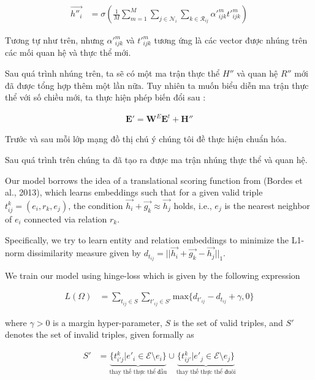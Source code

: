 \begin{align}
{\overrightarrow{h''_{i}}}&={\sigma\left(\frac{1}{M} \sum_{m=1}^{M} \sum_{j \in \mathcal{N}_i} \sum_{k \in \mathcal{R}_{ij}} \alpha'^m_{ijk} t'^m_{ijk}\right)}
\end{align}

Tương tự như trên, nhưng $\alpha'^m_{ijk}$ và $t'^m_{ijk}$ tương ứng là các vector được nhúng trên các mối quan hệ và thực thể mới.

Sau quá trình nhúng trên, ta sẽ có một ma trận thực thể $H''$ và quan hệ $R''$ mới đã được tổng hợp thêm một lần nữa. Tuy nhiên ta muốn biểu diễn ma trận thực thể với số chiều mới, ta thực hiện phép biến đổi sau :


\begin{align}
\mathbf{E'} = \mathbf{W}^E \mathbf{E}^t + \mathbf{H''}
\end{align}

Trước và sau mỗi lớp mạng đồ thị chú ý chúng tôi đề thực hiện chuẩn hóa.


Sau quá trình trên chúng ta đã tạo ra được ma trận nhúng thực thể và quan hệ. 

Our model borrows the idea of a translational
scoring function from (Bordes et al., 2013), which
learns embeddings such that for a given valid triple $t^k_{ij} = (e_i, r_k, e_j)$, the condition $\vec{h_i}+\vec{g_k} \approx \vec{h_j}$ holds, i.e., $e_j$ is the nearest neighbor of $e_i$ connected via relation $r_k$.

 Specifically, we try to learn entity and relation embeddings to minimize the L1-norm dissimilarity measure given by $d_{t_{ij}} = \big|\big|\vec{h_i}+ \vec{g_k}-\vec{h_j}\big|\big|_1$.

We train our model using hinge-loss which is
given by the following expression


\begin{align}
{L(\Omega)}&={\sum_{t_{ij} \in S} \sum_{t'_{ij} \in S'} \text{max}\{d_{t'_{ij}} - d_{t_{ij}} + \gamma , 0 \}}
\end{align}

where $\gamma > 0$ is a margin hyper-parameter, $S$ is the set of valid triples, and $S'$ denotes the set of invalid
triples, given formally as

\begin{align}
{S'}&={\underbrace{\{ t^k_{i'j} | e'_i \in \mathcal{E}\setminus e_i\}}_{\text{thay thế thực thể đầu}}\cup \underbrace{\{ t^k_{ij'} | e'_j \in \mathcal{E}\setminus e_j\}}_{\text{thay thế thực thể đuôi}}}
\end{align}

